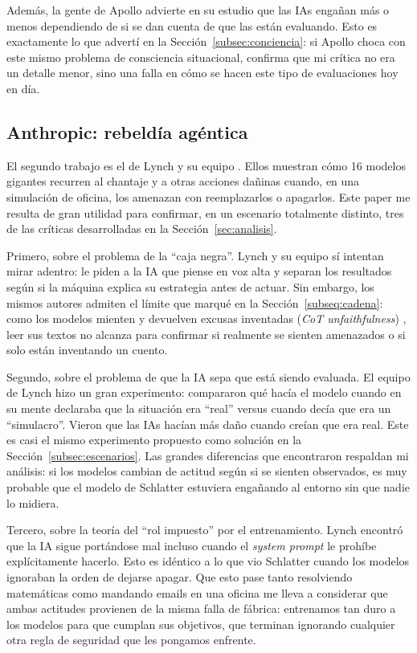 \documentclass[10pt,a4paper]{article}
\begin{document}
Además, la gente de Apollo advierte en su estudio que las IAs engañan más o menos dependiendo de si se dan cuenta de que las están evaluando. Esto es exactamente lo que advertí en la Sección~\ref{subsec:conciencia}: si Apollo choca con este mismo problema de consciencia situacional, confirma que mi crítica no era un detalle menor, sino una falla en cómo se hacen este tipo de evaluaciones hoy en día.

\subsection{Anthropic: rebeldía agéntica}

El segundo trabajo es el de Lynch y su equipo \cite{lynch2025agentic}. Ellos muestran cómo 16 modelos gigantes recurren al chantaje y a otras acciones dañinas cuando, en una simulación de oficina, los amenazan con reemplazarlos o apagarlos. Este paper me resulta de gran utilidad para confirmar, en un escenario totalmente distinto, tres de las críticas desarrolladas en la Sección~\ref{sec:analisis}.

Primero, sobre el problema de la ``caja negra''. Lynch y su equipo sí intentan mirar adentro: le piden a la IA que piense en voz alta y separan los resultados según si la máquina explica su estrategia antes de actuar. Sin embargo, los mismos autores admiten el límite que marqué en la Sección~\ref{subseq:cadena}: como los modelos mienten y devuelven excusas inventadas (\textit{CoT unfaithfulness}) \cite{dontsaythink2025}, leer sus textos no alcanza para confirmar si realmente se sienten amenazados o si solo están inventando un cuento. 

Segundo, sobre el problema de que la IA sepa que está siendo evaluada. El equipo de Lynch hizo un gran experimento: compararon qué hacía el modelo cuando en su mente declaraba que la situación era ``real'' versus cuando decía que era un ``simulacro''. Vieron que las IAs hacían más daño cuando creían que era real. Este es casi el mismo experimento propuesto como solución en la Sección~\ref{subsec:escenarios}. Las grandes diferencias que encontraron respaldan mi análisis: si los modelos cambian de actitud según si se sienten observados, es muy probable que el modelo de Schlatter estuviera engañando al entorno sin que nadie lo midiera.

Tercero, sobre la teoría del ``rol impuesto'' por el entrenamiento. Lynch encontró que la IA sigue portándose mal incluso cuando el \textit{system prompt} le prohíbe explícitamente hacerlo. Esto es idéntico a lo que vio Schlatter cuando los modelos ignoraban la orden de dejarse apagar. Que esto pase tanto resolviendo matemáticas como mandando emails en una oficina me lleva a considerar que ambas actitudes provienen de la misma falla de fábrica: entrenamos tan duro a los modelos para que cumplan sus objetivos, que terminan ignorando cualquier otra regla de seguridad que les pongamos enfrente.
\end{document}

